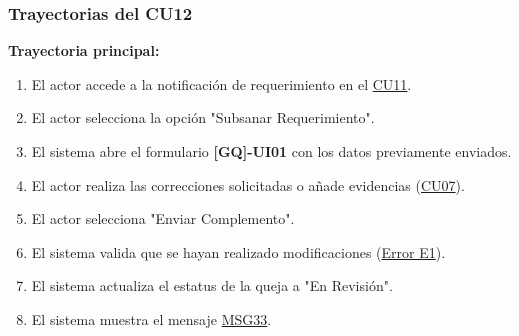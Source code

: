\begin{appendices}
\subsubsection{Trayectorias del CU12}
\textbf{Trayectoria principal:}
\begin{enumerate}[nosep]
    \item El actor accede a la notificación de requerimiento en el \hyperlink{anexo:casos_uso}{CU11}.
    \item El actor selecciona la opción "Subsanar Requerimiento".
    \item El sistema abre el formulario \textbf{[GQ]-UI01} con los datos previamente enviados.
    \item El actor realiza las correcciones solicitadas o añade evidencias (\hyperlink{anexo:casos_uso}{CU07}).
    \item El actor selecciona "Enviar Complemento".
    \item El sistema valida que se hayan realizado modificaciones (\hyperlink{err:E17}{Error E1}).
    \item El sistema actualiza el estatus de la queja a "En Revisión".
    \item El sistema muestra el mensaje \hyperlink{msg:MSG33}{MSG33}.
\end{enumerate}


\end{appendices}
